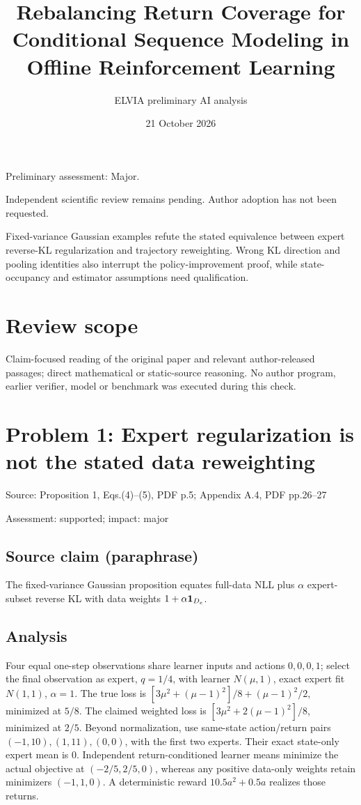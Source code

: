 \documentclass[11pt]{article}
\begin{document}
\title{Rebalancing Return Coverage for Conditional Sequence Modeling in Offline Reinforcement Learning}

\author{ELVIA preliminary AI analysis}\date{21 October 2026}\maketitle

Preliminary assessment: Major.\par

Independent scientific review remains pending. Author adoption has not been requested.

Fixed-variance Gaussian examples refute the stated equivalence between expert reverse-KL regularization and trajectory reweighting. Wrong KL direction and pooling identities also interrupt the policy-improvement proof, while state-occupancy and estimator assumptions need qualification.

\section*{Review scope}

Claim-focused reading of the original paper and relevant author-released passages; direct mathematical or static-source reasoning. No author program, earlier verifier, model or benchmark was executed during this check.

\section*{Problem 1: Expert regularization is not the stated data reweighting}

Source: Proposition 1, Eqs.(4)–(5), PDF p.5; Appendix A.4, PDF pp.26–27

Assessment: supported; impact: major

\subsection*{Source claim (paraphrase)}

The fixed-variance Gaussian proposition equates full-data NLL plus \(\alpha\) expert-subset reverse KL with data weights \(1+\alpha{\bf1}_{D_e}\).

\subsection*{Analysis}

Four equal one-step observations share learner inputs and actions \(0,0,0,1\); select the final observation as expert, \(q=1/4\), with learner \(N(\mu,1)\), exact expert fit \(N(1,1)\), \(\alpha=1\). The true loss is \([3\mu^2+(\mu-1)^2]/8+(\mu-1)^2/2\), minimized at \(5/8\). The claimed weighted loss is \([3\mu^2+2(\mu-1)^2]/8\), minimized at \(2/5\). Beyond normalization, use same-state action/return pairs \((-1,10),(1,11),(0,0)\), with the first two experts. Their exact state-only expert mean is \(0\). Independent return-conditioned learner means minimize the actual objective at \((-2/5,2/5,0)\), whereas any positive data-only weights retain minimizers \((-1,1,0)\). A deterministic reward \(10.5a^2+0.5a\) realizes those returns.
\end{document}
